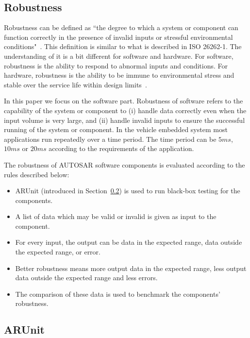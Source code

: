 \subsection{Robustness}
Robustness can be defined as ``the degree to which a system or component can function correctly in the presence of invalid inputs or stressful environmental conditions"~\cite{cc}. This definition is similar to what is described in ISO 26262-1. The understanding of it is a bit different for software and hardware. For software, robustness is the ability to respond to abnormal inputs and conditions. For hardware, robustness is the ability to be immune to environmental stress and stable over the service life within design limits~\cite{bb}. 

In this paper we focus on the software part. Robustness of software refers to the capability of the %
system or component to %
(i) handle data correctly even when the input volume is very large, and (ii) %
handle invalid inputs to ensure the successful running of the system or component. In the vehicle embedded system most applications run repeatedly over a time period. The time period can be $5ms$, $10ms$ or $20ms$ according to the requirements of the application. %

The robustness of AUTOSAR software components is evaluated according to the rules described below:
\begin{itemize}
\item ARUnit (introduced in Section~\ref{sec:arunit}) is used to run black-box testing for the components. 
\item A list of data which may be valid or invalid is given as input to the component. 
\item For every input, the output can be data in the expected range, data outside the expected range, or error. 
\item Better robustness means more output data in the expected range, less output data outside the expected range and less errors. 
\item The comparison of these data is used to benchmark the %
components' robustness.
\end{itemize}

 
\subsection{ARUnit}\label{sec:arunit}

